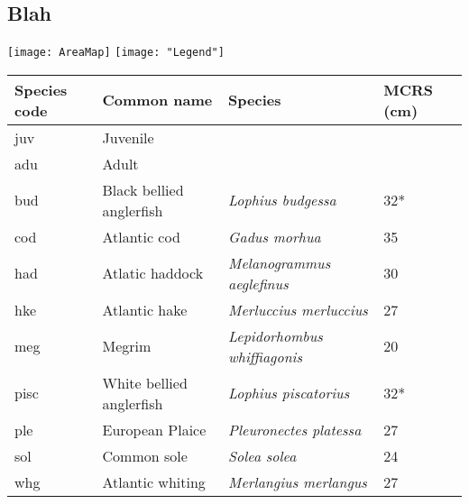 \documentclass[xcolor=x11names,compress]{beamer}
\renewcommand{\(}{\begin{columns}}
\renewcommand{\)}{\end{columns}}
\newcommand{\<}[1]{\begin{column}{#1}}
\renewcommand{\>}{\end{column}}
\begin{document}
\subsection{Blah}
\begin{frame}
	
\texttt{[image: AreaMap]}
\texttt{[image: "Legend"]}

\begin{table}[!htb]
	\tiny
	\center
	\begin{tabular}{ p{1cm} p{2cm} p{3cm} p{1cm}}
		\hline
		Species code & Common name              & Species & MCRS (cm) \\
		\hline
		juv          & Juvenile                 & & \\
		adu          & Adult                    & & \\
		\hline
		bud          & Black bellied anglerfish & \textit{Lophius budgessa} & 32* \\
		cod          & Atlantic cod             & \textit{Gadus morhua} & 35 \\
		had          & Atlatic haddock          & \textit{Melanogrammus	aeglefinus} & 30 \\
		hke          & Atlantic hake            & \textit{Merluccius merluccius} & 27 \\
		meg          & Megrim                   & \textit{Lepidorhombus whiffiagonis} & 20\\
		pisc         & White bellied anglerfish & \textit{Lophius piscatorius} & 32* \\
		ple          & European Plaice          & \textit{Pleuronectes platessa} & 27 \\
		sol          & Common sole              & \textit{Solea solea} & 24 \\
		whg          & Atlantic whiting         & \textit{Merlangius merlangus} & 27 \\
		\hline
		\end{tabular}

\end{table}
\end{frame}
\end{document}
